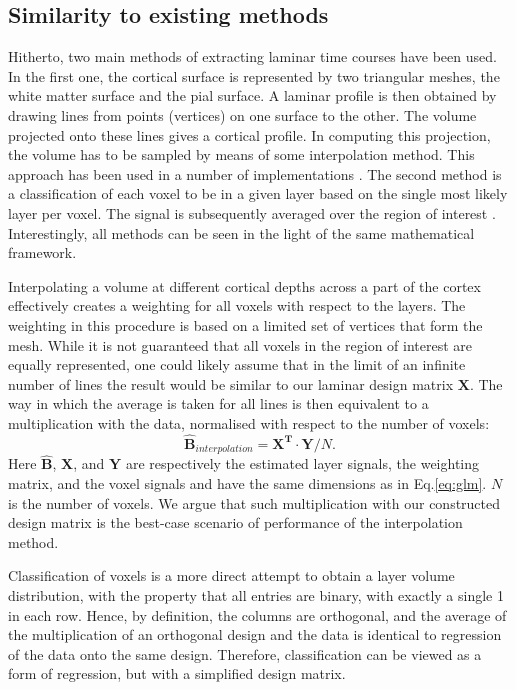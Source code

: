 \subsection{Similarity to existing methods} 
Hitherto, two main methods of extracting laminar time courses have been used. In the first one, the cortical surface is represented by two triangular meshes, the white matter surface and the pial surface. A laminar profile is then obtained by drawing lines from points (vertices) on one surface to the other. The volume projected onto these lines gives a cortical profile. In computing this projection, the volume has to be sampled by means of some interpolation method. This approach has been used in a number of implementations  \cite{Koopmans2011,Polimeni2010,DeMartino2013}. The second method is a classification of each voxel to be in a given layer based on the single most likely layer per voxel. The signal is subsequently averaged over the region of interest \cite{Siero2011,Olman2012,Maass2014}. Interestingly, all methods can be seen in the light of the same mathematical framework. 

Interpolating a volume at different cortical depths across a part of the cortex effectively creates a weighting for all voxels with respect to the layers. 
The weighting in this procedure is based on a limited set of vertices that form the mesh. While it is not guaranteed that all voxels in the region of interest are equally represented, one could likely assume that in the limit of an infinite number of lines the result would be similar to our laminar design matrix $\mathbf{X}$. The way in which the average is taken for all lines is then equivalent to a multiplication with the data, normalised with respect to the number of voxels:
\begin{equation}
\hat{\mathbf{B}}_{interpolation}= \mathbf{X^T} \cdot \mathbf{Y} / N.
\end{equation}
Here $\hat{\mathbf{B}}$, $\mathbf{X}$, and $\mathbf{Y}$ are respectively the estimated layer signals, the weighting matrix, and the voxel signals and have the same dimensions as in Eq.\ref{eq:glm}. $N$ is the number of voxels. We argue that such multiplication with our constructed design matrix is the best-case scenario of performance of the interpolation method.

Classification of voxels is a more direct attempt to obtain a layer volume distribution, with the property that all entries are binary, with exactly a single 1 in each row. Hence, by definition, the columns are orthogonal, and the average of the multiplication of an orthogonal design and the data is identical to regression of the data onto the same design. Therefore, classification can be viewed as a form of regression, but with a simplified design matrix. 

